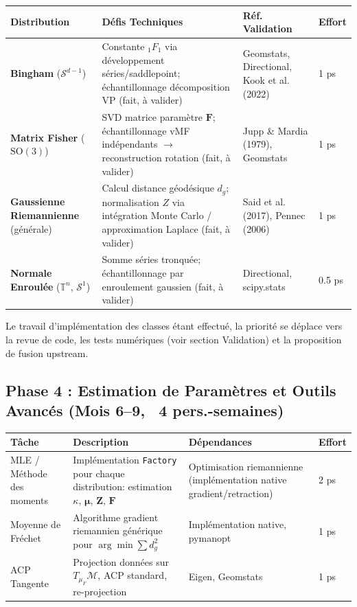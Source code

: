 \documentclass[11pt,a4paper]{article}
\begin{document}
\begin{longtable}{@{}p{3.5cm}p{3.5cm}p{3.5cm}p{2.5cm}@{}}
\toprule
\textbf{Distribution} & \textbf{Défis Techniques} & \textbf{Réf. Validation} & \textbf{Effort} \\
\midrule
\textbf{Bingham} ($\mathcal{S}^{d-1}$) & Constante ${}_1F_1$ via développement séries/saddlepoint; échantillonnage décomposition VP (fait, à valider) & Geomstats, Directional, Kook et al. (2022) & 1 ps \\
\textbf{Matrix Fisher} ($\text{SO}(3)$) & SVD matrice paramètre $\mathbf{F}$; échantillonnage vMF indépendants $\to$ reconstruction rotation (fait, à valider) & Jupp \& Mardia (1979), Geomstats & 1 ps \\
\textbf{Gaussienne Riemannienne} (générale) & Calcul distance géodésique $d_g$; normalisation $Z$ via intégration Monte Carlo / approximation Laplace (fait, à valider) & Said et al. (2017), Pennec (2006) & 1 ps \\
\textbf{Normale Enroulée} ($\mathbb{T}^n$, $\mathcal{S}^1$) & Somme séries tronquée; échantillonnage par enroulement gaussien (fait, à valider) & Directional, scipy.stats & 0.5 ps \\
\bottomrule
\end{longtable}

Le travail d'implémentation des classes étant effectué, la priorité se déplace vers la revue de code, les tests numériques (voir section Validation) et la proposition de fusion upstream.

\subsection{Phase 4 : Estimation de Paramètres et Outils Avancés (Mois 6--9, ~4 pers.-semaines)}

\begin{longtable}{@{}p{4cm}p{3.5cm}p{3.5cm}p{2.5cm}@{}}
\toprule
\textbf{Tâche} & \textbf{Description} & \textbf{Dépendances} & \textbf{Effort} \\
\midrule
MLE / Méthode des moments & Implémentation \texttt{Factory} pour chaque distribution: estimation $\kappa$, $\boldsymbol{\mu}$, $\mathbf{Z}$, $\mathbf{F}$ & Optimisation riemannienne (implémentation native gradient/retraction) & 2 ps \\
Moyenne de Fréchet & Algorithme gradient riemannien générique pour $\arg\min \sum d_g^2$ & Implémentation native, pymanopt & 1 ps \\
ACP Tangente & Projection données sur $T_{\mu_F}\mathcal{M}$, ACP standard, re-projection & Eigen, Geomstats & 1 ps \\
\bottomrule
\end{longtable}
\end{document}
